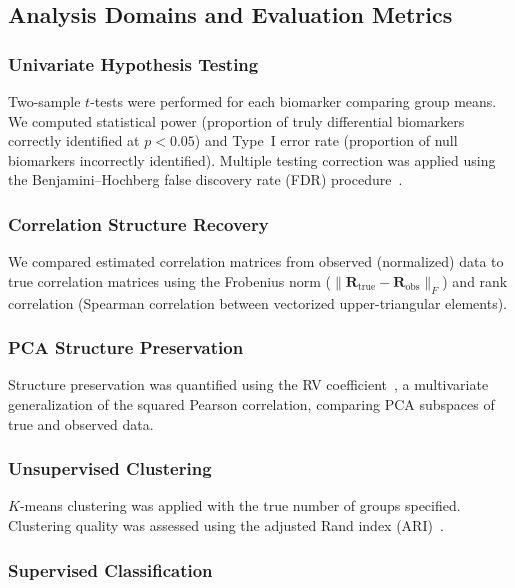 \documentclass[12pt]{article}
\newcommand{\Rtrue}{\mathbf{R}_{\mathrm{true}}}
\newcommand{\Robs}{\mathbf{R}_{\mathrm{obs}}}
\begin{document}
\subsection{Analysis Domains and Evaluation Metrics}

\subsubsection{Univariate Hypothesis Testing}

Two-sample $t$-tests were performed for each biomarker comparing group means. We computed statistical power (proportion of truly differential biomarkers correctly identified at $p < 0.05$) and Type~I error rate (proportion of null biomarkers incorrectly identified). Multiple testing correction was applied using the Benjamini--Hochberg false discovery rate (FDR) procedure~\cite{Benjamini1995}.

\subsubsection{Correlation Structure Recovery}

We compared estimated correlation matrices from observed (normalized) data to true correlation matrices using the Frobenius norm ($\|\Rtrue - \Robs\|_F$) and rank correlation (Spearman correlation between vectorized upper-triangular elements).

\subsubsection{PCA Structure Preservation}

Structure preservation was quantified using the RV coefficient~\cite{Robert1976}, a multivariate generalization of the squared Pearson correlation, comparing PCA subspaces of true and observed data.

\subsubsection{Unsupervised Clustering}

$K$-means clustering was applied with the true number of groups specified. Clustering quality was assessed using the adjusted Rand index (ARI)~\cite{Hubert1985}.

\subsubsection{Supervised Classification}
\end{document}
